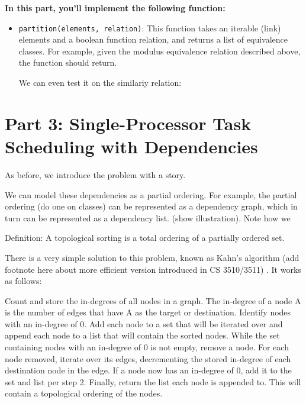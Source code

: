 \documentclass{article}
\begin{document}
    \vspace{3mm}
    \textbf{In this part, you'll implement the following function:}
    \begin{tcolorbox}[colback=blue!10]
        \begin{itemize}
            \item \lstinline{partition(elements, relation)}: This function takes an iterable (link) elements and a boolean function relation, and returns a list of equivalence classes. For example, given the modulus equivalence relation described above, the function should return.


            We can even test it on the similariy relation:
        \end{itemize}
    \end{tcolorbox}

\section*{Part 3: Single-Processor Task Scheduling with Dependencies}

    As before, we introduce the problem with a story. 


    We can model these dependencies as a partial ordering. For example, the partial ordering (do one on classes) can be represented as a dependency graph, which in turn can be represented as a dependency list. (show illustration). Note how we

    Definition: A topological sorting is a total ordering of a partially ordered set.

    


    There is a very simple solution to this problem, known as Kahn's algorithm (add footnote here about more efficient version introduced in CS 3510/3511) . It works as follows:

    Count and store the in-degrees of all nodes in a graph. The in-degree of a node A is the number of edges that have A as the target or destination.
Identify nodes with an in-degree of 0. Add each node to a set that will be iterated over and append each node to a list that will contain the sorted nodes.
While the set containing nodes with an in-degree of 0 is not empty, remove a node. For each node removed, iterate over its edges, decrementing the stored in-degree of each destination node in the edge. If a node now has an in-degree of 0, add it to the set and list per step 2.
Finally, return the list each node is appended to. This will contain a topological ordering of the nodes.
\end{document}
